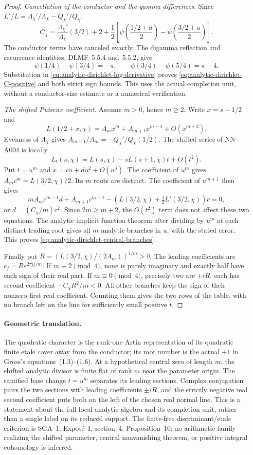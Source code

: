 \begin{proof}
\emph{Cancellation of the conductor and the gamma differences.}
Since $L'/L=\Lambda_\chi'/\Lambda_\chi-Q_\chi'/Q_\chi$,
\[
 C_\chi=\frac{\Lambda_\chi'}{\Lambda_\chi}(3/2)
          +2+\frac12\left[
              \psi\left(\frac{1/2+a}{2}\right)
             -\psi\left(\frac{3/2+a}{2}\right)\right].
\]
The conductor terms have canceled exactly. The digamma
reflection and recurrence identities, DLMF~5.5.4 and~5.5.2,
give
\[
 \psi(1/4)-\psi(3/4)=-\pi,\qquad
 \psi(3/4)-\psi(5/4)=\pi-4.
\]
Substitution in \eqref{eq:analytic-dirichlet-log-derivative}
proves \eqref{eq:analytic-dirichlet-C-positive} and both strict
sign bounds. This uses the actual completion unit, without a
conductor-size estimate or a numerical verification.

\emph{The shifted Puiseux coefficient.}
Assume $m>0$, hence $m\ge2$. Write $x=s-1/2$ and
\[
 L(1/2+x,\chi)=A_mx^m+A_{m+1}x^{m+1}+O(x^{m+2}).
\]
Evenness of $\Lambda_\chi$ gives
$A_{m+1}/A_m=-Q_\chi'/Q_\chi(1/2)$. The shifted series of
NN-A004 is locally
\[
 L_t(s,\chi)=L(s,\chi)-sL(s+1,\chi)t+O(t^2).
\]
Put $t=u^m$ and $x=cu+du^2+O(u^3)$. The coefficient of $u^m$
gives $A_mc^m=L(3/2,\chi)/2$. Its $m$ roots are distinct.
The coefficient of $u^{m+1}$ then gives
\[
 mA_mc^{m-1}d+A_{m+1}c^{m+1}
       -\left(L(3/2,\chi)+\tfrac12L'(3/2,\chi)\right)c=0,
\]
or $d=(C_\chi/m)c^2$. Since $2m\ge m+2$, the $O(t^2)$ term
does not affect these two equations. The analytic implicit
function theorem after dividing by $u^m$ at each distinct
leading root gives all $m$ analytic branches in $u$, with the
stated error. This proves
\eqref{eq:analytic-dirichlet-central-branches}.

Finally put $R=(L(3/2,\chi)/(2A_m))^{1/m}>0$. The leading
coefficients are $c_j=Re^{2\pi ij/m}$. If $m\equiv2\pmod4$,
none is purely imaginary and exactly half have each sign of
their real part. If $m\equiv0\pmod4$, precisely two are
$\pm iR$; each has second coefficient
$-C_\chi R^2/m<0$. All other branches keep the sign of their
nonzero first real coefficient. Counting them gives the two
rows of the table, with no branch left on the line for
sufficiently small positive $t$.
\end{proof}

\paragraph{Geometric translation.}
The quadratic character is the rank-one Artin representation of
its quadratic finite etale cover away from the conductor; its
root number is the actual $+1$ in Gross's equations~(1.3)--(1.6).
At a hypothetical central zero of length $m$, the shifted
analytic divisor is finite flat of rank $m$ near the parameter
origin. The ramified base change $t=u^m$ separates its leading
sections. Complex conjugation pairs the two sections with
leading coefficients $\pm iR$, and the strictly negative real
second coefficient puts both on the left of the chosen real
normal line. This is a statement about the full local analytic
algebra and its completion unit, rather than a single label on
its reduced support. The finite-free discriminant/etale
criterion is SGA~1, Expos\'e~I, section~4, Proposition~10; no
arithmetic family realizing the shifted parameter, central
nonvanishing theorem, or positive integral cohomology is inferred.
